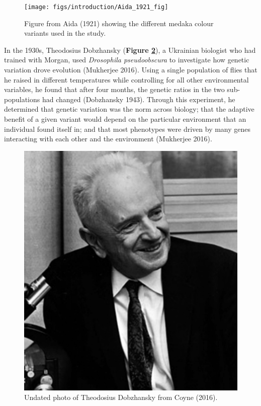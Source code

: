 \documentclass[
]{book}
\begin{document}
\begin{figure}

{\centering \texttt{[image: figs/introduction/Aida\_1921\_fig]} 

}

\caption{Figure from Aida (1921) showing the different medaka colour variants used in the study.}\label{fig:aida-fig}
\end{figure}

In the 1930s, Theodosius Dobzhansky (\textbf{Figure \ref{fig:dobzhansky}}), a Ukrainian biologist who had trained with Morgan, used \emph{Drosophila pseudoobscura} to investigate how genetic variation drove evolution (Mukherjee 2016). Using a single population of flies that he raised in different temperatures while controlling for all other environmental variables, he found that after four months, the genetic ratios in the two sub-populations had changed (Dobzhansky 1943). Through this experiment, he determined that genetic variation was the norm across biology; that the adaptive benefit of a given variant would depend on the particular environment that an individual found itself in; and that most phenotypes were driven by many genes interacting with each other and the environment (Mukherjee 2016).



\begin{figure}

{\centering \includegraphics[width=1\linewidth]{figs/introduction/Dobzhansky} 

}

\caption{Undated photo of Theodosius Dobzhansky from Coyne (2016).}\label{fig:dobzhansky}
\end{figure}
\end{document}
